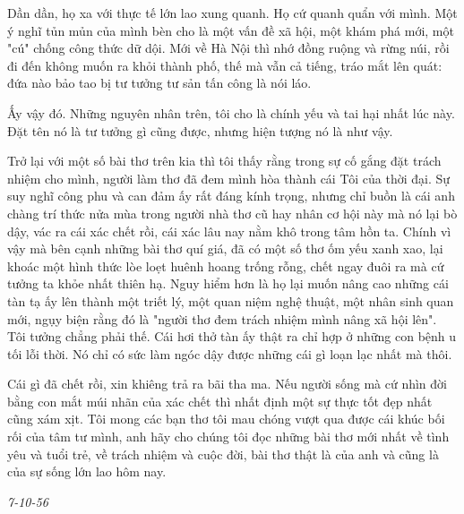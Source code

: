 \documentclass[../main.tex]{subfiles}
\begin{document}
\begin{multicols}{2}
Dần dần, họ xa với thực tế lớn lao xung quanh. Họ cứ quanh quẩn với mình. Một ý nghĩ tủn mủn của mình bèn cho là một vấn đề xã hội, một khám phá mới, một "cú" chống công thức dữ dội. Mới về Hà Nội thì nhớ đồng ruộng và rừng núi, rồi đi đến không muốn ra khỏi thành phố, thế mà vẫn cả tiếng, tráo mắt lên quát: đứa nào bảo tao bị tư tưởng tư sản tấn công là nói láo. 
 
Ấy vậy đó. Những nguyên nhân trên, tôi cho là chính yếu và tai hại nhất lúc này. Đặt tên nó là tư tưởng gì cũng được, nhưng hiện tượng nó là như vậy. 
 
Trở lại với một số bài thơ trên kia thì tôi thấy rằng trong sự cố gắng đặt trách nhiệm cho mình, người làm thơ đã đem mình hòa thành cái Tôi của thời đại. Sự suy nghĩ công phu và can đảm ấy rất đáng kính trọng, nhưng chỉ buồn là cái anh chàng trí thức nửa mùa trong người nhà thơ cũ hay nhân cơ hội này mà nó lại bò dậy, vác ra cái xác chết rồi, cái xác lâu nay nằm khô trong tâm hồn ta. Chính vì vậy mà bên cạnh những bài thơ quí giá, đã có một số thơ ốm yếu xanh xao, lại khoác một hình thức lòe loẹt huênh hoang trống rỗng, chết ngay đuôi ra mà cứ tưởng ta khỏe nhất thiên hạ. Nguy hiểm hơn là họ lại muốn nâng cao những cái tàn tạ ấy lên thành một triết lý, một quan niệm nghệ thuật, một nhân sinh quan mới, ngụy biện rằng đó là "người thơ đem trách nhiệm mình nâng xã hội lên". Tôi tưởng chẳng phải thế. Cái hơi thở tàn ấy thật ra chỉ hợp ở những con bệnh u tối lỗi thời. Nó chỉ có sức làm ngóc dậy được những cái gì loạn lạc nhất mà thôi. 
 
Cái gì đã chết rồi, xin khiêng trả ra bãi tha ma. Nếu người sống mà cứ nhìn đời bằng con mắt múi nhãn của xác chết thì nhất định một sự thực tốt đẹp nhất cũng xám xịt. Tôi mong các bạn thơ tôi mau chóng vượt qua được cái khúc bối rối của tâm tư mình, anh hãy cho chúng tôi đọc những bài thơ mới nhất về tình yêu và tuổi trẻ, về trách nhiệm và cuộc đời, bài thơ thật là của anh và cũng là của sự sống lớn lao hôm nay. 
								 
\textit{7-10-56} 
\end{multicols}
\end{document}
